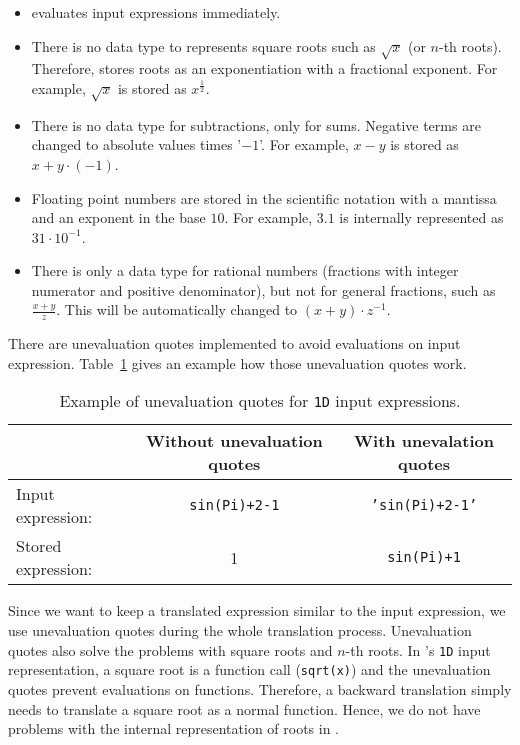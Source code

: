 \begin{itemize}
\item \Maple{} evaluates input expressions immediately.
\item There is no data type to represents square roots such as $\sqrt{x}$ (or $n$-th roots). Therefore, \Maple{} stores roots as an exponentiation with a fractional exponent. For example, $\sqrt{x}$ is stored as $x^{\frac{1}{2}}$.
\item There is no data type for subtractions, only for sums. Negative terms are changed to absolute values times '$-1$'. For example, $x-y$ is stored as $x + y \cdot (-1)$. 
\item Floating point numbers are stored in the scientific notation with a mantissa and an exponent in the base $10$. For example, $3.1$ is internally represented as $31 \cdot 10^{-1}$.
\item There is only a data type for rational numbers (fractions with integer numerator and positive denominator), but not for general fractions, such as $\frac{x+y}{z}$. This will be automatically changed to $(x+y)\cdot z^{-1}$.
\end{itemize}

There are unevaluation quotes implemented to avoid evaluations on input expression. Table~\ref{tab:unevaluation-quotes} gives an example how those unevaluation quotes work.

\begin{table}[ht]
\centering
\begin{tabular}{lcc}
\hline
& Without unevaluation quotes & With unevalation quotes\\
\hline
Input expression: & \texttt{sin(Pi)+2-1} & \texttt{'sin(Pi)+2-1'}\\
Stored expression: & 1 & \texttt{sin(Pi)+1}\\
\hline
\end{tabular}
\caption{Example of unevaluation quotes for \texttt{1D} \Maple{} input expressions.}
\label{tab:unevaluation-quotes}
\end{table}

Since we want to keep a translated expression similar to the input expression, we use unevaluation quotes during the whole translation process. Unevaluation quotes also solve the problems with square roots and $n$-th roots. In \Maple's \texttt{1D} input representation, a square root is a function call (\texttt{sqrt(x)}) and the unevaluation quotes prevent evaluations on functions. Therefore, a backward translation simply needs to translate a square root as a normal function. Hence, we do not have problems with the internal representation of roots in \Maple.

